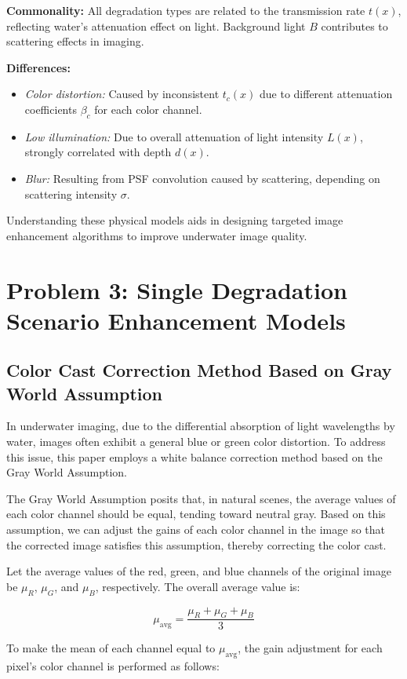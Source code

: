\documentclass{apmcmthesis}
\begin{document}
\textbf{Commonality:} All degradation types are related to the transmission rate $t(x)$, reflecting water's attenuation effect on light. Background light $B$ contributes to scattering effects in imaging.

\textbf{Differences:}  
\begin{itemize}
    \item \textit{Color distortion:} Caused by inconsistent $t_c(x)$ due to different attenuation coefficients $\beta_c$ for each color channel.  
    \item \textit{Low illumination:} Due to overall attenuation of light intensity $L(x)$, strongly correlated with depth $d(x)$.  
    \item \textit{Blur:} Resulting from PSF convolution caused by scattering, depending on scattering intensity $\sigma$.
\end{itemize}


Understanding these physical models aids in designing targeted image enhancement algorithms to improve underwater image quality.

\section{Problem 3: Single Degradation Scenario Enhancement Models}

\subsection{Color Cast Correction Method Based on Gray World Assumption}
In underwater imaging, due to the differential absorption of light wavelengths by water, images often exhibit a general blue or green color distortion. To address this issue, this paper employs a white balance correction method based on the Gray World Assumption.

The Gray World Assumption posits that, in natural scenes, the average values of each color channel should be equal, tending toward neutral gray. Based on this assumption, we can adjust the gains of each color channel in the image so that the corrected image satisfies this assumption, thereby correcting the color cast.

Let the average values of the red, green, and blue channels of the original image be $\mu_R$, $\mu_G$, and $\mu_B$, respectively. The overall average value is:

\[
\mu_{\text{avg}} = \frac{\mu_R + \mu_G + \mu_B}{3}
\]

To make the mean of each channel equal to $\mu_{\text{avg}}$, the gain adjustment for each pixel's color channel is performed as follows:
\end{document}
